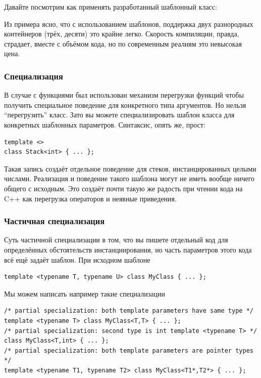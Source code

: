 \documentclass[a4paper,12pt,oneside]{article}
\begin{document}
Давайте посмотрим как применять разработанный шаблонный класс:



Из примера ясно, что с использованием шаблонов, поддержка двух разнородных контейнеров (трёх, десяти) это крайне легко. Скорость компиляции, правда, страдает, вместе с объёмом кода, но по современным реалиям это невысокая цена.

\subsubsection{Специализация}

В случае с функциями был использован механизм перегрузки функций чтобы получить специальное поведение для конкретного типа аргументов. Но нельзя ``перегрузить'' класс. Зато вы можете специализировать шаблон класса для конкретных шаблонных параметров. Синтаксис, опять же, прост:

\begin{lstlisting}
template <>
class Stack<int> { ... };
\end{lstlisting}

Такая запись создаёт отдельное поведение для стеков, инстанцированных целыми числами. Реализация и поведение такого шаблона могут не иметь вообще ничего общего с исходным. Это создаёт почти такую же радость при чтении кода на C++ как перегрузка операторов и неявные приведения.

\subsubsection{Частичная специализация}

Суть частичной специализации в том, что вы пишете отдельный код для определённых обстоятельств инстанциирования, но часть параметров этого кода всё ещё задаёт шаблон. При исходном шаблоне

\begin{lstlisting}
template <typename T, typename U> class MyClass { ... };
\end{lstlisting}

Мы можем написать например такие специализации

\begin{lstlisting}
/* partial specialization: both template parameters have same type */ 
template <typename T> class MyClass<T,T> { ... }; 
/* partial specialization: second type is int template <typename T> */ 
class MyClass<T,int> { ... }; 
/* partial specialization: both template parameters are pointer types */
template <typename T1, typename T2> class MyClass<T1*,T2*> { ... };
\end{lstlisting}
\end{document}
